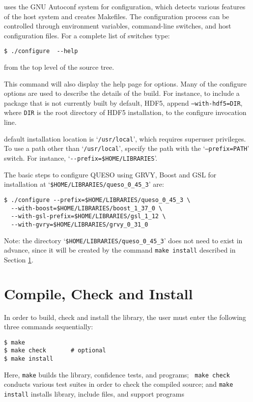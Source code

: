 \Queso{} uses the GNU Autoconf system for configuration, which detects various features of the host system and creates Makefiles. 
The configuration process can be controlled through environment variables, command-line switches, and host configuration files.
For a complete list of switches type:
\begin{lstlisting}
$ ./configure  --help  
\end{lstlisting}
%
from the top level of the source tree. 

This command will also display the help page for \Queso{} options.  Many of the \Queso{} configure options are used to describe the details of the build. For instance, to include a package that is not currently built by default, HDF5, append \texttt{--with-hdf5=DIR}, where \texttt{DIR} is the root directory of HDF5 installation,  to the configure invocation line. 

\Queso{} default installation location is `\texttt{/usr/local}', which requires superuser privileges. To use a path
        other than `\texttt{/usr/local}', specify the path with the `\texttt{--prefix=PATH}' switch. For instance, `\verb+--prefix=$HOME/LIBRARIES+'.



The basic steps to configure QUESO using GRVY, Boost and GSL for installation at `\verb+$HOME/LIBRARIES/queso_0_45_3+' are:
\begin{lstlisting}
$ ./configure --prefix=$HOME/LIBRARIES/queso_0_45_3 \
  --with-boost=$HOME/LIBRARIES/boost_1_37_0 \
  --with-gsl-prefix=$HOME/LIBRARIES/gsl_1_12 \
  --with-gvry=$HOME/LIBRARIES/grvy_0_31_0
\end{lstlisting}

Note: the directory `\verb+$HOME/LIBRARIES/queso_0_45_3+' does not need to exist in advance, since it will be created by the command \verb+make install+ described in Section \ref{sec:install_Queso_make}.


\section{Compile, Check and Install \Queso{}}\label{sec:install_Queso_make}
%
In order to build, check and install the library, the user must enter the following three commands sequentially:
\begin{lstlisting}
$ make
$ make check       # optional
$ make install 
\end{lstlisting}

Here, \verb+make+ builds the library, confidence tests, and programs;  \verb+ make check+ conducts various test suites in order to check the compiled source; and \verb+make install+ installs \Queso{} library, include files, and support programs


